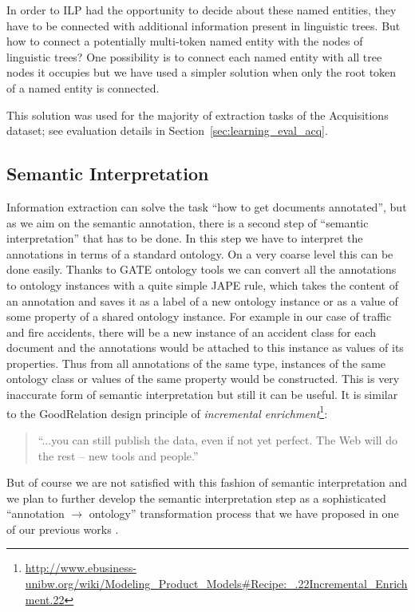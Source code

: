 In order to ILP had the opportunity to decide about these named entities, they have to be connected with additional information present in linguistic trees. But how to connect a potentially multi-token named entity with the nodes of linguistic trees? One possibility is to connect each named entity with all tree nodes it occupies but we have used a simpler solution when only the root token of a named entity is connected.

This solution was used for the majority of extraction tasks of the Acquisitions dataset; see evaluation details in Section~\ref{sec:learning_eval_acq}.

\subsection{Semantic Interpretation} \label{sec:SemanticInterpretation}

Information extraction can solve the task ``how to get documents annotated'', but as we aim on the semantic annotation, there is a second step of ``semantic interpretation'' that has to be done. In this step we have to interpret the annotations in terms of a standard ontology. On a very coarse level this can be done easily. Thanks to GATE ontology tools \citep{Bon04b} we can convert all the annotations to ontology instances with a quite simple JAPE \citep{Cunningham00jape:a} rule, which takes the content of an annotation and saves it as a label of a new ontology instance or as a value of some property of a shared ontology instance. For example in our case of traffic and fire accidents, there will be a new instance of an accident class for each document and the annotations would be attached to this instance as values of its properties. Thus from all annotations of the same type, instances of the same ontology class or values of the same property would be constructed. This is very inaccurate form of semantic interpretation but still it can be useful. It is similar to the GoodRelation \citep{DBLP:conf/ekaw/Hepp08} design principle of \emph{incremental enrichment}\footnote{\url{http://www.ebusiness-unibw.org/wiki/Modeling_Product_Models#Recipe:_.22Incremental_Enrichment.22}}:

\begin{quote}
``...you can still publish the data, even if not yet perfect. The Web will do the rest -- new tools and people.''	
\end{quote}

But of course we are not satisfied with this fashion of semantic interpretation and we plan to further develop the semantic interpretation step as a sophisticated ``annotation $\rightarrow$ ontology'' transformation process that we have proposed in one of our previous works \citep{biblio:DeVoComputingaggregations2008}.



